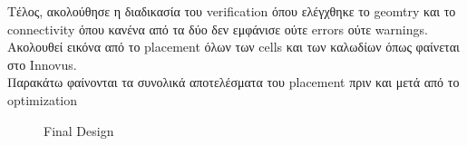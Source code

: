 \documentclass[12pt,a4paper]{article}
\begin{document}
     Τέλος, ακολούθησε η διαδικασία του verification όπου ελέγχθηκε το geomtry και το connectivity όπου κανένα από τα δύο δεν εμφάνισε ούτε errors ούτε warnings.
     Ακολουθεί εικόνα από το placement όλων των cells και των καλωδίων όπως φαίνεται στο Innovus.\\
 	Παρακάτω φαίνονται τα συνολικά αποτελέσματα του placement πριν και μετά από το optimization
 	\begin{figure} [h]
 		\caption{Final Design}
 		\label{Final Design}
 	\end{figure}

    
 	
 	
\end{document}
